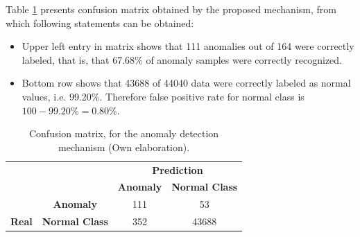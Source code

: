 \vspace{5mm} %

Table \ref{table:matriz_resultado} presents confusion matrix obtained by the proposed mechanism, from which following statements can be obtained:

\begin{itemize}
\item Upper left entry in matrix shows that 111 anomalies out of 164 were correctly labeled, that is, that 67.68\% of anomaly samples were correctly recognized.
\item Bottom row shows that 43688 of 44040 data were correctly labeled as normal values, i.e. 99.20\%. Therefore false positive rate for normal class is $100−99.20\% = 0.80\%$.
\end{itemize}

\begin{table}[H]

\centering
\begin{center}
\begin{tabular}{ll|c|c|}
\cline{3-4}
                                                        &                                              & \multicolumn{2}{c|}{\textbf{Prediction}}                                                          \\ \cline{3-4} 
                                                        &                                              & \textbf{Anomaly}                         & \textbf{Normal Class}                         \\ \hline
\multicolumn{1}{|c|}{}                                  & \multicolumn{1}{c|}{\textbf{Anomaly}} & \cellcolor[HTML]{AADD99}111 & \cellcolor[HTML]{FFCE93}53 \\ \cline{2-4} 
\multicolumn{1}{|c|}{\multirow{-2}{*}{\textbf{Real}}} & \multicolumn{1}{c|}{\textbf{Normal Class}} & \cellcolor[HTML]{DF9F9F}352 & \cellcolor[HTML]{AADD99}43688 \\ \hline
\end{tabular}
\caption{Confusion matrix, for the anomaly detection mechanism (Own elaboration).}
\label{table:matriz_resultado}
\end{center}
\end{table}

